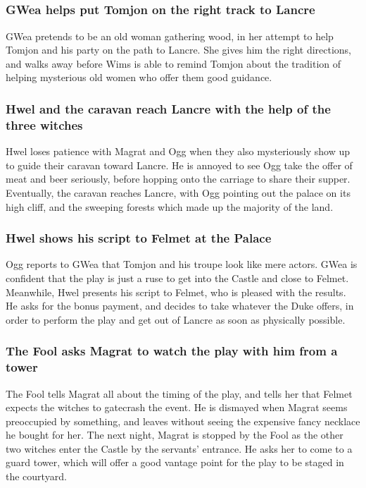 \subsection{}
\subsubsection{\Gls{GWea} helps put \Gls{Tomjon} on the right track to Lancre}
\Gls{GWea} pretends to be an old woman gathering wood, in her attempt to help \Gls{Tomjon} and his
party on the path to Lancre. She gives him the right directions, and walks away before \Gls{Wims}
is able to remind \Gls{Tomjon} about the tradition of helping mysterious old women who offer them
good guidance.

\subsubsection{\Gls{Hwel} and the caravan reach Lancre with the help of the three witches}
\Gls{Hwel} loses patience with \Gls{Magrat} and \Gls{Ogg} when they also mysteriously show up to
guide their caravan toward Lancre. He is annoyed to see \Gls{Ogg} take the offer of meat and beer
seriously, before hopping onto the carriage to share their supper. Eventually, the caravan reaches
Lancre, with \Gls{Ogg} pointing out the palace on its high cliff, and the sweeping forests which
made up the majority of the land.

\subsubsection{\Gls{Hwel} shows his script to \Gls{Felmet} at the Palace}
\Gls{Ogg} reports to \Gls{GWea} that \Gls{Tomjon} and his troupe look like mere actors. \Gls{GWea}
is confident that the play is just a ruse to get into the Castle and close to \Gls{Felmet}.
Meanwhile, \Gls{Hwel} presents his script to \Gls{Felmet}, who is pleased with the results. He asks
for the bonus payment, and decides to take whatever the Duke offers, in order to perform the play
and get out of Lancre as soon as physically possible.

\subsubsection{The \Gls{Fool} asks \Gls{Magrat} to watch the play with him from a tower}
The \Gls{Fool} tells \Gls{Magrat} all about the timing of the play, and tells her that \Gls{Felmet}
expects the witches to gatecrash the event. He is dismayed when \Gls{Magrat} seems preoccupied by
something, and leaves without seeing the expensive fancy necklace he bought for her. The next night,
\Gls{Magrat} is stopped by the \Gls{Fool} as the other two witches enter the Castle by the servants'
entrance. He asks her to come to a guard tower, which will offer a good vantage point for the play
to be staged in the courtyard.

